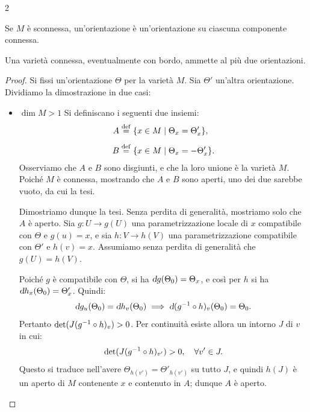 \begin{multicols*}{2}
\begin{definition}
        Se $M$ è sconnessa, un'orientazione è un'orientazione su ciascuna componente connessa.
    \end{definition}

    \begin{proposition}
        Una varietà connessa, eventualmente con bordo, ammette al più due orientazioni.
    \end{proposition}

    \begin{proof} Si fissi un'orientazione $\Theta$ per la varietà $M$. Sia $\Theta'$ un'altra orientazione.
        Dividiamo la dimostrazione in due casi:
        \begin{itemize}
            \item $\boxed{\dim M > 1}$ Si definiscano i seguenti due insiemi:
                  \begin{equation*}
                      \begin{aligned}
                          A & \overset{\mathrm{def}}{=} \{ x \in M \mid \Theta_x = \Theta'_x \},  \\[1ex]
                          B & \overset{\mathrm{def}}{=} \{ x \in M \mid \Theta_x = -\Theta'_x \}.
                      \end{aligned}
                  \end{equation*}
                  Osserviamo che $A$ e $B$ sono disgiunti, e che la loro unione è la varietà $M$. Poiché
                  $M$ è connessa, mostrando che $A$ e $B$ sono aperti, uno dei due sarebbe vuoto, da cui la tesi. \smallskip

                  Dimostriamo dunque la tesi. Senza perdita di generalità, mostriamo solo che $A$ è aperto. Sia
                  $g : U \to g(U)$ una parametrizzazione locale di $x$ compatibile con $\Theta$ e $g(u) = x$, e sia $h : V \to h(V)$
                  una parametrizzazione compatibile con $\Theta'$ e $h(v) = x$. Assumiamo senza perdita di generalità che $g(U) = h(V)$. \smallskip

                  Poiché $g$ è compatibile con $\Theta$, si ha $\dif g(\Theta_0) = \Theta_x$, e così
                  per $h$ si ha $\dif h_x(\Theta_0) = \Theta'_x$. Quindi:
                  \[
                      \dif g_u(\Theta_0) = \dif h_v(\Theta_0) \implies \dif (g\inv \circ h)_v (\Theta_0) = \Theta_0.
                  \]
                  Pertanto $\det(J(g^{-1} \circ h)_v) > 0$. Per continuità esiste allora un intorno $J$ di $v$ in cui:
                  \[
                      \det(J(g^{-1} \circ h)_{v'}) > 0, \quad \forall v' \in J.
                  \]
                  Questo si traduce nell'avere $\Theta_{h(v')} = \Theta'_{h(v')}$ su tutto $J$, e quindi
                  $h(J)$ è un aperto di $M$ contenente $x$ e contenuto in $A$; dunque $A$ è aperto.


\end{itemize}
\end{proof}
\end{multicols*}

